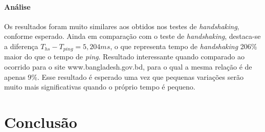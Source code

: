 \documentclass[12pt,a4paper]{report}
\begin{document}
\subsubsection*{Análise}

Os resultados foram muito similares aos obtidos nos testes de \textit{handshaking}, conforme esperado. Ainda em comparação com o teste de \textit{handshaking}, destaca-se a diferença \(T_{hs} - T_{ping} = 5,204 ms\), o que representa tempo de \textit{handshaking} 206\% maior do que o tempo de \textit{ping}. Resultado interessante quando comparado ao ocorrido para o site www.bangladesh.gov.bd, para o qual a mesma relação é de apenas 9\%. Esse resultado é esperado uma vez que pequenas variações serão muito mais significativas quando o próprio tempo é pequeno.




\chapter{Conclusão}
\end{document}
